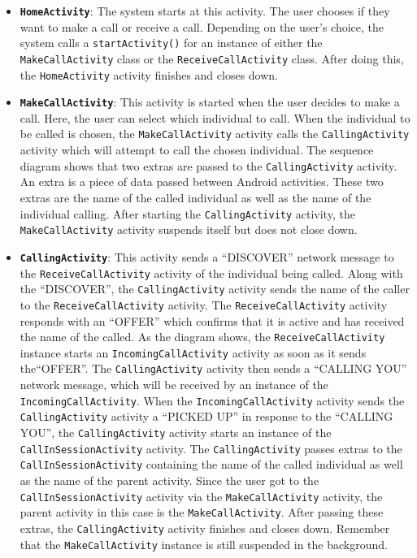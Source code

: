 \documentclass[12pt,svgnames,smaller]{article} %
\begin{document}
	\begin{itemize}
		\item {\textbf{\texttt{HomeActivity}}}: The system starts at this activity. The user chooses if they want to make a call or receive a call. Depending on the user’s choice, the system calls a \texttt{startActivity()} for an instance of either the \texttt{MakeCallActivity} class or the \texttt{ReceiveCallActivity} class. After doing this, the \texttt{HomeActivity} activity finishes and closes down.
		\item \textbf{\texttt{MakeCallActivity}}: This activity is started when the user decides to make a call. Here, the user can select which individual to call. When the individual to be called is chosen, the \texttt{MakeCallActivity} activity calls the \texttt{CallingActivity} activity which will attempt to call the chosen individual. The sequence diagram shows that two extras are passed to the \texttt{CallingActivity} activity. An extra is a piece of data passed between Android activities. These two extras are the name of the called individual as well as the name of the individual calling. After starting the \texttt{CallingActivity} activity, the \texttt{MakeCallActivity} activity suspends itself but does not close down.
		\item \textbf{\texttt{CallingActivity}}: This activity sends a “DISCOVER” network message to the \texttt{ReceiveCallActivity} activity of the individual being called. Along with the “DISCOVER”, the \texttt{CallingActivity} activity sends the name of the caller to the \texttt{ReceiveCallActivity} activity. The \texttt{ReceiveCallActivity} activity responds with an “OFFER” which confirms that it is active and has received the name of the called. As the diagram shows, the \texttt{ReceiveCallActivity} instance starts an \texttt{IncomingCallActivity} activity as soon as it sends the“OFFER”. The \texttt{CallingActivity} activity then sends a “CALLING YOU” network message, which will be received by an instance of the \texttt{IncomingCallActivity}. When the \texttt{IncomingCallActivity} activity sends the \texttt{CallingActivity} activity a “PICKED UP” in response to the “CALLING YOU”, the \texttt{CallingActivity} activity starts an instance of the \texttt{CallInSessionActivity} activity. The \texttt{CallingActivity} passes extras to the \texttt{CallInSessionActivity} containing the name of the called individual as well as the name of the parent activity. Since the user got to the \texttt{CallInSessionActivity} activity via the \texttt{MakeCallActivity} activity, the parent activity in this case is the \texttt{MakeCallActivity}. After passing these extras, the \texttt{CallingActivity} activity finishes and closes down. Remember that the \texttt{MakeCallActivity} instance is still suspended in the background.

\end{itemize}
\end{document}
